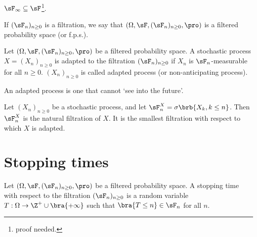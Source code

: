 \begin{remark}
$\sF_\infty\subseteq \sF$\footnote{proof needed.}.%
\end{remark}

\begin{definition}
If $(\sF_n)_{n\geq 0}$ is a filtration, we say that $(\Omega,\sF, (\sF_n)_{n\geq 0},\pro)$ is a filtered probability space (or f.p.s.).
\end{definition}

\begin{definition}\label{def:adapted_process_discrete}
Let $(\Omega,\sF, (\sF_n)_{n\geq 0},\pro)$ be a filtered probability space. A stochastic process $X = (X_n)_{n\geq 0}$ is adapted to the filtration $(\sF_n)_{n \geq 0}$ if $X_n$ is $\sF_n$-measurable for all $n\geq 0$. $(X_n)_{n\geq 0}$ is called adapted process (or non-anticipating process).
\end{definition}

\begin{remark}
An adapted process is one that cannot `see into the future'.
\end{remark}

\begin{definition}
Let $(X_n)_{n\geq 0}$ be a stochastic process, and let $\sF^X_n = \sigma\brb{X_k, k \leq n}$. Then $\sF^X_n$ is the natural filtration of $X$. It is the smallest filtration with respect to which $X$ is adapted.
\end{definition}

\section{Stopping times}

\begin{definition}
Let $(\Omega,\sF, (\sF_n)_{n\geq 0},\pro)$ be a filtered probability space. A stopping time with respect to the filtration $(\sF_n)_{n\geq 0}$ is a random variable $T:\Omega \to \Z^+\cup \bra{+\infty}$ such that $\bra{T \leq n} \in \sF_n$ for all $n$.
\end{definition}


